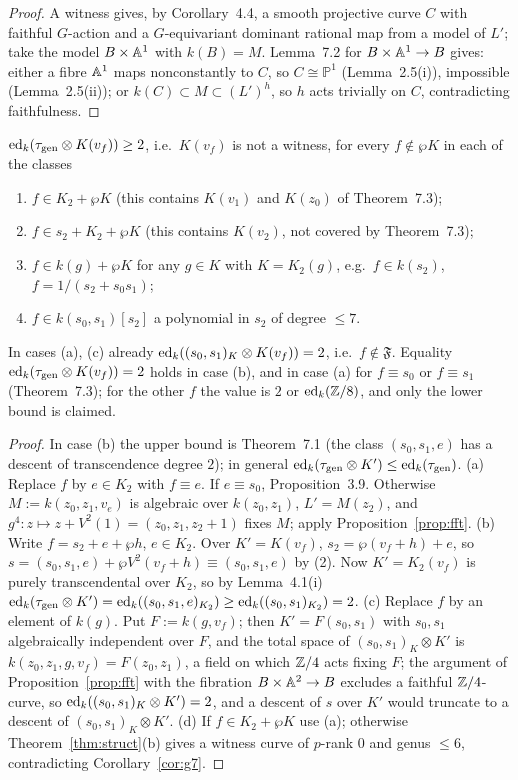 \begin{proof}
A witness gives, by Corollary~4.4, a smooth projective curve $C$ with faithful
$G$-action and a $G$-equivariant dominant rational map from a model of $L'$; take the
model $B\times\mathbb A^1$ with $k(B)=M$. Lemma~7.2 for $B\times\mathbb A^1\to B$ gives: either a fibre
$\mathbb A^1$ maps nonconstantly to $C$, so $C\cong\mathbb P^1$ (Lemma~2.5(i)), impossible
(Lemma~2.5(ii)); or $k(C)\subset M\subset(L')^h$, so $h$ acts trivially on $C$,
contradicting faithfulness.
\end{proof}

\begin{theorem}\label{thm:fam}
$\operatorname{ed}_k(\tau_{\mathrm{gen}}\otimes K(v_f))\ge2$, i.e.\ $K(v_f)$ is not a witness, for every
$f\notin\wp K$ in each of the classes
\begin{enumerate}
\item[(a)] $f\in K_2+\wp K$ (this contains $K(v_1)$ and $K(z_0)$ of Theorem~7.3);
\item[(b)] $f\in s_2+K_2+\wp K$ (this contains $K(v_2)$, not covered by Theorem~7.3);
\item[(c)] $f\in k(g)+\wp K$ for any $g\in K$ with $K=K_2(g)$, e.g.\ $f\in k(s_2)$,
$f=1/(s_2+s_0s_1)$;
\item[(d)] $f\in k(s_0,s_1)[s_2]$ a polynomial in $s_2$ of degree $\le7$.
\end{enumerate}
In cases (a), (c) already $\operatorname{ed}_k((s_0,s_1)_K\otimes K(v_f))=2$, i.e.\ $f\notin\mathfrak F$.
Equality $\operatorname{ed}_k(\tau_{\mathrm{gen}}\otimes K(v_f))=2$ holds in case (b), and in case (a) for
$f\equiv s_0$ or $f\equiv s_1$ (Theorem~7.3); for the other $f$ the value is $2$ or
$\operatorname{ed}_k(\mathbb Z/8)$, and only the lower bound is claimed.
\end{theorem}

\begin{proof}
In case (b) the upper bound is Theorem~7.1 (the class $(s_0,s_1,e)$ has a descent of
transcendence degree $2$); in general $\operatorname{ed}_k(\tau_{\mathrm{gen}}\otimes K')\le\operatorname{ed}_k(\tau_{\mathrm{gen}})$. (a) Replace $f$ by $e\in K_2$ with $f\equiv e$. If
$e\equiv s_0$, Proposition~3.9. Otherwise $M:=k(z_0,z_1,v_e)$ is algebraic over
$k(z_0,z_1)$, $L'=M(z_2)$, and $g^4\colon z\mapsto z+V^2(1)=(z_0,z_1,z_2+1)$ fixes $M$;
apply Proposition~\ref{prop:fft}. (b) Write $f=s_2+e+\wp h$, $e\in K_2$. Over
$K'=K(v_f)$, $s_2=\wp(v_f+h)+e$, so $s=(s_0,s_1,e)+\wp V^2(v_f+h)\equiv(s_0,s_1,e)$ by
(2). Now $K'=K_2(v_f)$ is purely transcendental over $K_2$, so by Lemma~4.1(i)
$\operatorname{ed}_k(\tau_{\mathrm{gen}}\otimes K')=\operatorname{ed}_k((s_0,s_1,e)_{K_2})\ge\operatorname{ed}_k((s_0,s_1)_{K_2})=2$.
(c) Replace $f$ by an element of $k(g)$. Put $F:=k(g,v_f)$; then $K'=F(s_0,s_1)$ with
$s_0,s_1$ algebraically independent over $F$, and the total space of $(s_0,s_1)_K\otimes
K'$ is $k(z_0,z_1,g,v_f)=F(z_0,z_1)$, a field on which $\mathbb Z/4$ acts fixing $F$; the
argument of Proposition~\ref{prop:fft} with the fibration $B\times\mathbb A^2\to B$ excludes a
faithful $\mathbb Z/4$-curve, so $\operatorname{ed}_k((s_0,s_1)_K\otimes K')=2$, and a descent of $s$ over
$K'$ would truncate to a descent of $(s_0,s_1)_K\otimes K'$. (d) If $f\in K_2+\wp K$ use
(a); otherwise Theorem~\ref{thm:struct}(b) gives a witness curve of $p$-rank $0$ and
genus $\le6$, contradicting Corollary~\ref{cor:g7}.
\end{proof}

